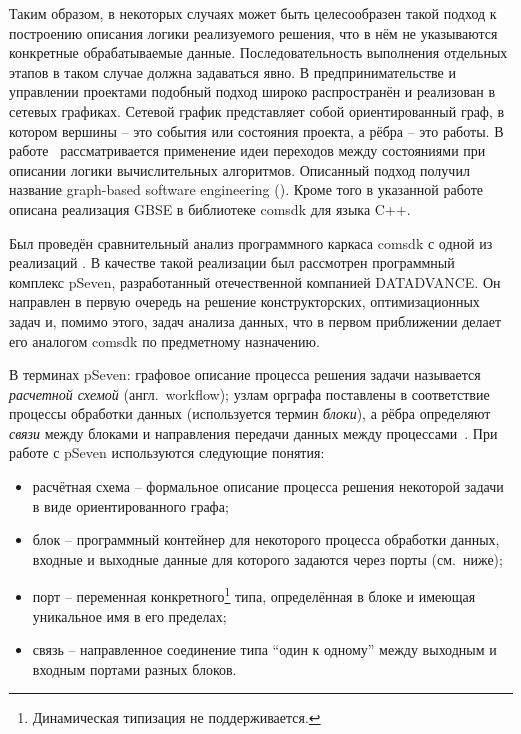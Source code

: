 Таким образом, в некоторых случаях может быть целесообразен такой подход к построению описания логики реализуемого решения, что в нём не указываются конкретные обрабатываемые данные. Последовательность выполнения отдельных этапов в таком случае должна задаваться явно. В предпринимательстве и управлении проектами подобный подход широко распространён и реализован в сетевых графиках. Сетевой график представляет собой ориентированный граф, в котором вершины -- это события или состояния проекта, а рёбра -- это работы. В работе~\cite{SokolovPershin2018} рассматривается применение идеи переходов между состояниями при описании логики вычислительных алгоритмов. Описанный подход получил название graph-based software engineering (). Кроме того в указанной работе описана реализация GBSE в библиотеке comsdk для языка C++.

Был проведён сравнительный анализ программного каркаса comsdk с одной из реализаций . В качестве такой реализации был рассмотрен программный комплекс pSeven, разработанный отечественной компанией DATADVANCE. Он направлен в первую очередь на решение конструкторских, оптимизационных задач и, помимо этого, задач анализа данных, что в первом приближении делает его аналогом comsdk по предметному назначению.

В терминах \textsf{pSeven}: графовое описание процесса решения задачи называется \textit{расчетной схемой} (англ.~workflow); узлам орграфа поставлены в соответствие процессы обработки данных (используется термин \textit{блоки}), а рёбра определяют \textit{связи} между блоками и направления передачи данных между процессами~\cite{NazarenkoDFM2015}. При работе с pSeven используются следующие понятия:
\begin{itemize}
  \item \textsf{расчётная схема} -- формальное описание процесса решения некоторой задачи в виде ориентированного графа;
  \item \textsf{блок} -- программный контейнер для некоторого процесса обработки данных, входные и выходные данные для которого задаются через порты (см.~ниже);
  \item \textsf{порт} -- переменная конкретного\footnote{Динамическая типизация не поддерживается.} типа, определённая в блоке и имеющая уникальное имя в его пределах;
  \item \textsf{связь} -- направленное соединение типа ``один к одному'' между выходным и входным портами разных блоков.
\end{itemize}

